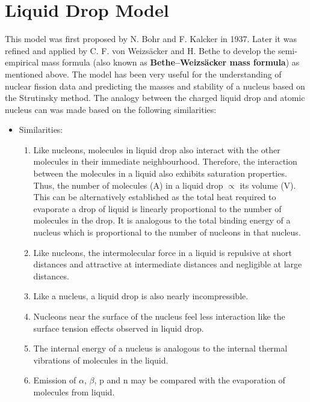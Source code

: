 
\section{Liquid Drop Model}
This model was first proposed by N. Bohr and F. Kalcker in 1937. Later it was refined and applied by C. F. von Weizsäcker and H. Bethe to develop the semi-empirical mass formula (also known as \textbf{Bethe–Weizsäcker mass formula}) as mentioned above.  The model has been very useful for the understanding of nuclear fission data and predicting the masses and stability of a nucleus based on the Strutinsky method. The analogy between the charged liquid drop and atomic nucleus can was made based on the following similarities:

    \begin{itemize}
    
        \item Similarities:
        
            \begin{enumerate}
                \item Like nucleons, molecules in liquid drop also interact with the other molecules in their immediate neighbourhood. Therefore, the interaction between the molecules in a liquid also exhibits saturation properties. Thus, the number of molecules (A) in a liquid drop $\propto$ its volume (V). This can be alternatively established as the total heat required to evaporate a drop of liquid is linearly proportional to the number of molecules in the drop. It is analogous to the total binding energy of a nucleus which is proportional to the number of nucleons in that nucleus.
                \item Like nucleons, the intermolecular force in a liquid is repulsive at short distances and attractive at intermediate distances and negligible at large distances.
                \item Like a nucleus, a liquid drop is also nearly incompressible.
                \item Nucleons near the surface of the nucleus feel less interaction like the surface tension effects observed in liquid drop.
                \item The internal energy of a nucleus is analogous to the internal thermal vibrations of molecules in the liquid.
                \item Emission of $\alpha$, $\beta$, p and n may be compared with the evaporation of molecules from liquid.
            \end{enumerate}
        

\end{itemize}
